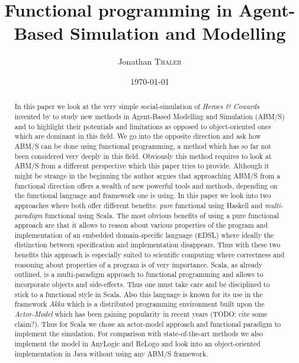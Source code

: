 \documentclass{article}
\title{Functional programming in Agent-Based Simulation and Modelling} %
\author{Jonathan \textsc{Thaler}} %
\date{\today} %
\begin{document}
\maketitle %

\begin{abstract}
In this paper we look at the very simple social-simulation of \textit{Heroes \& Cowards} invented by \cite{wilensky_introduction_2015} to study new methods in Agent-Based Modelling and Simulation (ABM/S) and to highlight their potentials and limitations as opposed to object-oriented ones which are dominant in this field. We go into the opposite direction and ask how ABM/S can be done using functional programming, a method which has so far not been considered very deeply in this field. Obviously this method requires to look at ABM/S from a different perspective which this paper tries to provide. Although it might be strange in the beginning the author argues that approaching ABM/S from a functional direction offers a wealth of new powerful tools and methods, depending on the functional language and framework one is using. In this paper we look into two approaches where both offer different benefits: \textit{pure} functional using Haskell and \textit{multi-paradigm} functional using Scala. The most obvious benefits of using a pure functional approach are that it allows to reason about various properties of the program and implementation of an embedded domain-specific language (EDSL) where ideally the distinction between specification and implementation disappears. Thus with these two benefits this approach is especially suited to scientific computing where correctness and reasoning about properties of a program is of very importance. Scala, as already outlined, is a multi-paradigm approach to functional programming and allows to incorporate objects and side-effects. Thus one must take care and be disciplined to stick to a functional style in Scala. Also this language is known for its use in the framework \textit{Akka} which is a distributed programming environment built upon the \textit{Actor-Model} which has been gaining popularity in recent years (TODO: cite some claim?). Thus for Scala we chose an actor-model approach and functional paradigm to implement the simulation. For comparison with state-of-the-art methods we also implement the model in AnyLogic and ReLogo and look into an object-oriented implementation in Java without using any ABM/S framework.
\end{abstract}











\newpage



\end{document}
